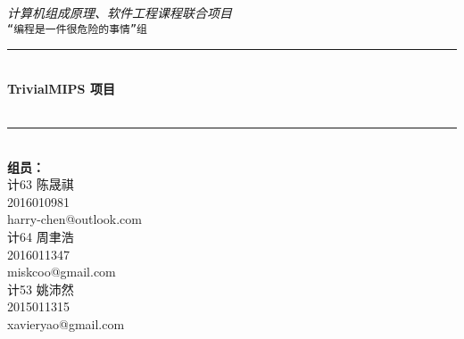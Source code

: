 \begin{titlepage}

    \newcommand{\HRule}{\rule{\linewidth}{0.5mm}}
  
    \vfill
    \center 
    
    \textit{\Large 计算机组成原理、软件工程课程联合项目}\\[0.5cm] 
    \texttt{\Large “编程是一件很危险的事情”组}
  
  
    \vspace{1.5 cm}
    \HRule \\[0.4cm]
    { \huge \bfseries TrivialMIPS 项目}\\[0.4cm]
    { \huge \bfseries \artname}\\
    \HRule \\[1.5cm]
   
  
    {\Large\textbf{组员：}}\\
    \vspace{.5 cm}
    计63 陈晟祺\\
    2016010981\\
    harry-chen@outlook.com\\
    \vspace{.5 cm}
    计64 周聿浩\\
    2016011347\\
    miskcoo@gmail.com\\
    \vspace{.5 cm}
    计53 姚沛然\\
    2015011315\\
    xavieryao@gmail.com\\
  
    \vspace{1.5 cm}
    {\large \artdate}\\[3cm] 
  
  
  \vfill
  
\end{titlepage}